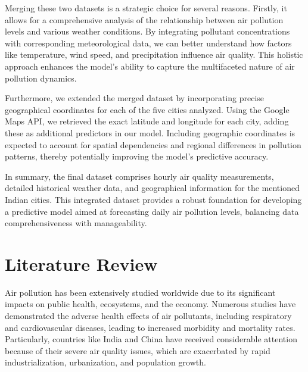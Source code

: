 \documentclass[twoside,11pt]{article}
\begin{document}
Merging these two datasets is a strategic choice for several reasons. Firstly, it allows for a comprehensive analysis of the relationship between air pollution levels and various weather conditions. By integrating pollutant concentrations with corresponding meteorological data, we can better understand how factors like temperature, wind speed, and precipitation influence air quality. This holistic approach enhances the model's ability to capture the multifaceted nature of air pollution dynamics.

Furthermore, we extended the merged dataset by incorporating precise geographical coordinates for each of the five cities analyzed. Using the Google Maps API, we retrieved the exact latitude and longitude for each city, adding these as additional predictors in our model. Including geographic coordinates is expected to account for spatial dependencies and regional differences in pollution patterns, thereby potentially improving the model's predictive accuracy.

In summary, the final dataset comprises hourly air quality measurements, detailed historical weather data, and geographical information for the mentioned Indian cities. This integrated dataset provides a robust foundation for developing a predictive model aimed at forecasting daily air pollution levels, balancing data comprehensiveness with manageability.

\newpage





\section{Literature Review}
Air pollution has been extensively studied worldwide due to its significant impacts on public health, ecosystems, and the economy. Numerous studies have demonstrated the adverse health effects of air pollutants, including respiratory and cardiovascular diseases, leading to increased morbidity and mortality rates. Particularly, countries like India and China have received considerable attention because of their severe air quality issues, which are exacerbated by rapid industrialization, urbanization, and population growth.
\end{document}
